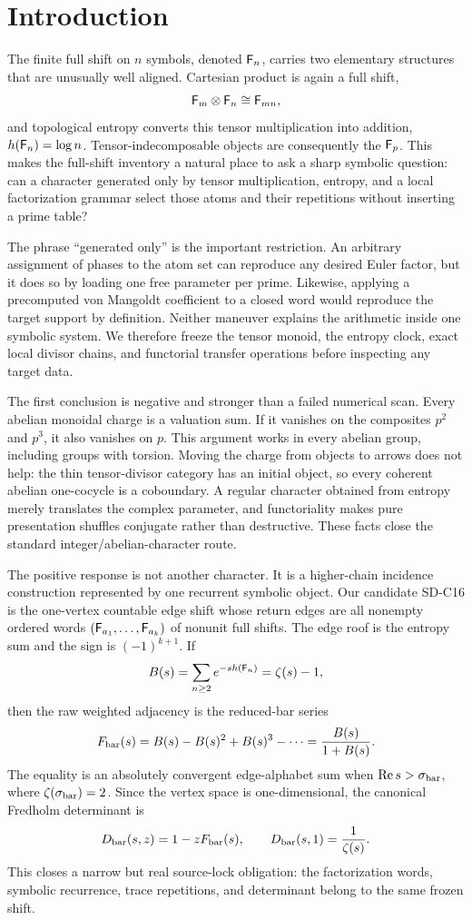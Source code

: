 \section{Introduction}
\label{sec:introduction}

The finite full shift on $n$ symbols, denoted $\mathsf F_n$, carries two elementary
structures that are unusually well aligned.  Cartesian product is again a
full shift,
\[
  \mathsf F_m\otimes\mathsf F_n\cong\mathsf F_{mn},
\]
and topological entropy converts this tensor multiplication into addition,
$h(\mathsf F_n)=\log n$.  Tensor-indecomposable objects are consequently the
$\mathsf F_p$.  This makes the full-shift inventory a natural place to ask a sharp
symbolic question: can a character generated only by tensor multiplication,
entropy, and a local factorization grammar select those atoms and their
repetitions without inserting a prime table?

The phrase ``generated only'' is the important restriction.  An arbitrary
assignment of phases to the atom set can reproduce any desired Euler factor,
but it does so by loading one free parameter per prime.  Likewise, applying a
precomputed von Mangoldt coefficient to a closed word would reproduce the
target support by definition.  Neither maneuver explains the arithmetic
inside one symbolic system.  We therefore freeze the tensor monoid, the
entropy clock, exact local divisor chains, and functorial transfer operations
before inspecting any target data.

The first conclusion is negative and stronger than a failed numerical scan.
Every abelian monoidal charge is a valuation sum.  If it vanishes on the
composites $p^2$ and $p^3$, it also vanishes on $p$.  This argument works in
every abelian group, including groups with torsion.  Moving the charge from
objects to arrows does not help: the thin tensor-divisor category has an
initial object, so every coherent abelian one-cocycle is a coboundary.  A
regular character obtained from entropy merely translates the complex
parameter, and functoriality makes pure presentation shuffles conjugate rather
than destructive.  These facts close the standard integer/abelian-character
route.

The positive response is not another character.  It is a higher-chain
incidence construction represented by one recurrent symbolic object.  Our
candidate SD-C16 is the one-vertex countable edge shift whose return edges are
all nonempty ordered words
$(\mathsf F_{a_1},\ldots,\mathsf F_{a_k})$ of nonunit full shifts.  The edge roof is the
entropy sum and the sign is $(-1)^{k+1}$.  If
\[
  B(s)=\sum_{n\ge2}e^{-s h(\mathsf F_n)}=\zeta(s)-1,
\]
then the raw weighted adjacency is the reduced-bar series
\[
  F_{\rm bar}(s)=B(s)-B(s)^2+B(s)^3-\cdots
           =\frac{B(s)}{1+B(s)}.
\]
The equality is an absolutely convergent edge-alphabet sum when
$\operatorname{Re} s>\sigma_{\rm bar}$, where $\zeta(\sigma_{\rm bar})=2$.  Since the vertex space is
one-dimensional, the canonical Fredholm determinant is
\[
  D_{\rm bar}(s,z)=1-zF_{\rm bar}(s),
  \qquad
  D_{\rm bar}(s,1)=\frac{1}{\zeta(s)}.
\]
This closes a narrow but real source-lock obligation: the factorization
words, symbolic recurrence, trace repetitions, and determinant belong to the
same frozen shift.

